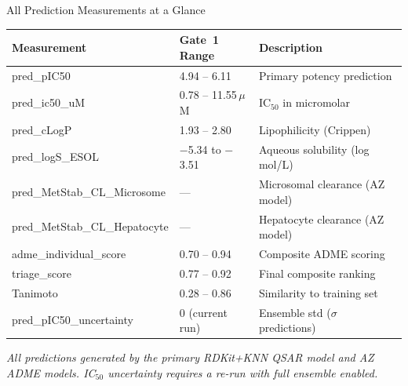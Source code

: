 \documentclass[aspectratio=169]{beamer}
\begin{document}
\begin{frame}{All Prediction Measurements at a Glance}
  \centering
  \small
  \begin{tabular}{p{3.8cm}p{3.0cm}p{4.5cm}}
    \toprule
    \textbf{Measurement} & \textbf{Gate~1 Range} & \textbf{Description} \\
    \midrule
    pred\_pIC50           & 4.94 -- 6.11          & Primary potency prediction \\
    pred\_ic50\_uM        & 0.78 -- 11.55\,$\mu$M & IC$_{50}$ in micromolar \\
    pred\_cLogP           & 1.93 -- 2.80           & Lipophilicity (Crippen) \\
    pred\_logS\_ESOL      & $-$5.34 to $-$3.51    & Aqueous solubility (log mol/L) \\
    pred\_MetStab\_CL\_Microsome & --- & Microsomal clearance (AZ model) \\
    pred\_MetStab\_CL\_Hepatocyte & --- & Hepatocyte clearance (AZ model) \\
    adme\_individual\_score & 0.70 -- 0.94         & Composite ADME scoring \\
    triage\_score         & 0.77 -- 0.92           & Final composite ranking \\
    Tanimoto              & 0.28 -- 0.86           & Similarity to training set \\
    pred\_pIC50\_uncertainty & 0 (current run)     & Ensemble std ($\sigma$ predictions) \\
    \bottomrule
  \end{tabular}
  \vspace{0.5em}
  {\small\textit{All predictions generated by the primary RDKit+KNN QSAR model and AZ ADME models. IC$_{50}$ uncertainty requires a re-run with full ensemble enabled.}}
\end{frame}
\end{document}
